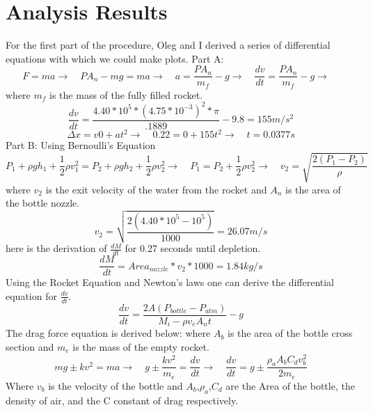 \documentclass[a4paper,11pt]{article}
\begin{document}
\section{Analysis Results}
{}
{\quad For the first part of the procedure, Oleg and I derived a series of differential equations with which we could make plots.}
{Part A: }
\begin{equation} 
    F = ma  \rightarrow \quad PA_{n} - mg = ma \rightarrow \quad a = \frac{PA_{n}}{m_{f}}-g \rightarrow \quad \frac{dv}{dt} = \frac{PA_{n}}{m_{f}}-g \rightarrow \quad 
\end{equation}
{where $m_{f}$ is the mass of the fully filled rocket.}
\begin{equation}   
    \frac{dv}{dt} = \frac{4.40*10^5*(4.75*10^{-3})^{2}*\pi}{.1889}-9.8 = 155 m/s^2
\end{equation}
\begin{equation}   
    \Delta x = v0 + at^2 \rightarrow \quad 0.22 = 0 + 155t^2 \rightarrow \quad t = 0.0377s
\end{equation}
{Part B: Using Bernoulli's Equation}
\begin{equation} 
    P_{1} + \rho gh_{1} + \frac{1}{2}\rho v_{1}^2 = P_{2} + \rho gh_{2} + \frac{1}{2}\rho v_{2}^2\rightarrow\quad  P_{1} = P_{2} + \frac{1}{2}\rho v_{2}^2\rightarrow \quad v_{2} = \sqrt{\frac{2(P_{1} - P_{2})}{\rho}}  
\end{equation}
{where $v_{2}$ is the exit velocity of the water from the rocket and $A_{n}$ is the area of the bottle nozzle.}
\begin{equation}
    v_{2} = \sqrt{\frac{2(4.40*10^5- 10^5)}{1000}} = 26.07m/s
\end{equation}
{here is the derivation of $\frac{dM}{dt}$ for 0.27 seconds until depletion.}
\begin{equation}
    \frac{dM}{dt} = Area_{nozzle} * v_{2} * 1000 = 1.84 kg/s  
\end{equation}
{Using the Rocket Equation and Newton's laws one can derive the differential equation for $\frac{dv}{dt}$.}
\begin{equation}
    \frac{dv}{dt} = \frac{2A(P_{bottle} - P_{atm})}{M_{i} - \rho v_{e} A_{n} t} - g
\end{equation}
{The drag force equation is derived below: where $A_{b}$ is the area of the bottle cross section and $m_{e}$ is the mass of the empty rocket.}
\begin{equation}
    mg \pm kv^2 = ma \rightarrow \quad g \pm \frac{kv^2}{m_{e}} = \frac{dv}{dt} \rightarrow \quad 
    \frac{dv}{dt} = g \pm \frac{\rho_{a} A_{b}C_{d}v_{b}^2}{2m_{e}}
\end{equation}
{Where $v_{b}$ is the velocity of the bottle and $A_{b}$,$\rho_{a}$,$C_{d}$ are the Area of the bottle, the density of air, and the C constant of drag respectively.}
\begin{figure}[H]
\end{figure}
\end{document}
